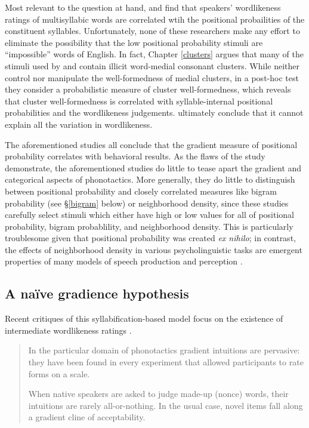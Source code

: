 Most relevant to the question at hand, \citet{Vitevitch1997} and \citet{Frisch2000} find that speakers' wordlikeness ratings of multisyllabic words are correlated wtih the positional probailities of the constituent syllables. Unfortunately, none of these researchers make any effort to eliminate the possibility that the low positional probability stimuli are ``impossible'' words of English. In fact, 
Chapter \ref{clusters} argues
that many of the stimuli used by \citet{Vitevitch1997} and \citet{Frisch2000} contain illicit word-medial consonant clusters. While \citeauthor{Vitevitch1997} neither control nor manipulate the well-formedness of medial clusters, in a post-hoc test they consider a probabilistic measure of cluster well-formedness, which reveals that cluster well-formedness is correlated with syllable-internal positional probabilities and the wordlikeness judgements. \citeauthor{Vitevitch1997} ultimately conclude that it cannot explain all the variation in wordlikeness. 

The aforementioned studies all conclude that the gradient measure of positional probability correlates with behavioral results. As the flaws of the \citet{Vitevitch1997} study demonstrate, the aforementioned studies do little to tease apart the gradient and categorical aspects of phonotactics. More generally, they do little to distinguish between positional probability and closely correlated measures like bigram probability (see \S\ref{bigram} below) or neighborhood density, since these studies carefully select stimuli which either have high or low values for all of positional probability, bigram probablility, and neighborhood density. This is particularly troublesome given that positional probability was created \emph{ex nihilo}; in contrast, the effects of neighborhood density in various psycholinguistic tasks are emergent properties of many models of speech production \citep[e.g.,][]{Luce1998,Luce2000} and perception \citep{Marslen-Wilson1984,Marslen-Wilson1987,McClelland1986,Norris1994,Norris2000}. 

\subsection{A naïve gradience hypothesis}

Recent critiques of this syllabification-based model focus on the existence of intermediate wordlikeness ratings \citep[see also][]{Coleman1997,Anttila2008}.

\begin{quote}
In the particular domain of phonotactics gradient intuitions are pervasive: they have been found in every experiment that allowed participants to rate forms on a scale.
\citep[][382]{Hayes2008a}

When native speakers are asked to judge made-up (nonce) words, their intuitions are rarely all-or-nothing. In the usual case, novel items fall along a gradient cline of acceptability. \citep[][9]{Albright2009a}
\end{quote}

